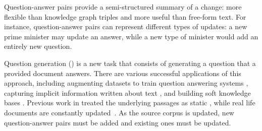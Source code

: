 Question-answer pairs provide a semi-structured summary of a change: more flexible than knowledge graph triples and more useful than free-form text. 
%
%
For instance, question-answer pairs can represent different types of updates: a new prime minister may update an answer, while a new type of minister would add an entirely new question. 
%
%
%

Question generation (\qg{}) is a new \nlp{} task that consists of generating a question that a provided document answers. There are various successful applications of this approach, including augmenting datasets to train question answering systems \citep{duan-etal-2017-question, lewis-etal-2021-paq}, capturing implicit information written about text \citep{pyatkin-etal-2021-asking}, and building soft knowledge bases \citep{chen-etal-2022-qamat}. Previous work in \qg{} treated the underlying passages as static \citep{lewis-etal-2021-paq}, while real life documents are constantly updated~\citep{dhingra-etal-2022-time}. As the source corpus is updated, new question-answer pairs must be added and existing ones must be updated. %

